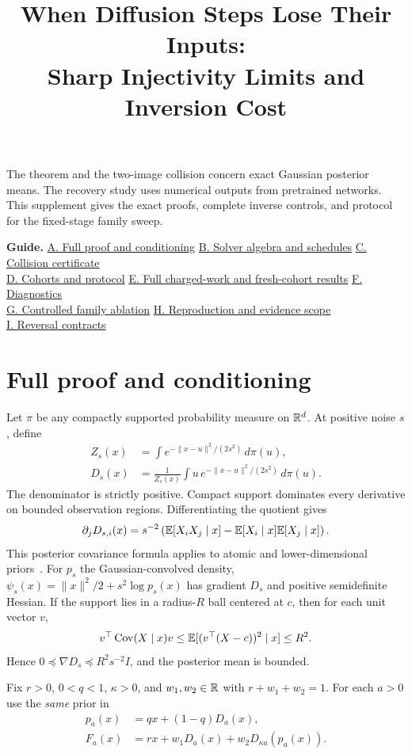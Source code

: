 \documentclass[10pt,twocolumn,letterpaper]{article}
\title{When Diffusion Steps Lose Their Inputs:\\Sharp Injectivity Limits and Inversion Cost}
\begin{document}
\maketitlesupplementary

\noindent The theorem and the two-image collision concern exact Gaussian posterior means. The recovery study uses numerical outputs from pretrained networks. This supplement gives the exact proofs, complete inverse controls, and protocol for the fixed-stage family sweep.

\medskip
\noindent\textbf{Guide.}
\hyperref[sec:proof]{A. Full proof and conditioning}
\enspace\textperiodcentered\enspace
\hyperref[sec:algebra]{B. Solver algebra and schedules}
\enspace\textperiodcentered\enspace
\hyperref[sec:exact]{C. Collision certificate}\\
\hyperref[sec:protocol]{D. Cohorts and protocol}
\enspace\textperiodcentered\enspace
\hyperref[sec:observations]{E. Full charged-work and fresh-cohort results}
\enspace\textperiodcentered\enspace
\hyperref[sec:diagnostics]{F. Diagnostics}\\
\hyperref[sec:controlled]{G. Controlled family ablation}
\enspace\textperiodcentered\enspace
\hyperref[sec:replay]{H. Reproduction and evidence scope}\\
\hyperref[sec:contracts]{I. Reversal contracts}

\section{Full proof and conditioning}
\label{sec:proof}
Let $\pi$ be any compactly supported probability measure on $\mathbb R^d$. At positive noise $s$, define
\[
 \begin{aligned}
 Z_s(x)&=\int e^{-\|x-u\|^2/(2s^2)}\,d\pi(u),\\
 D_s(x)&=\frac{1}{Z_s(x)}\int u\, e^{-\|x-u\|^2/(2s^2)}\,d\pi(u).
 \end{aligned}
\]
The denominator is strictly positive. Compact support dominates every derivative on bounded observation regions. Differentiating the quotient gives
\[
 \partial_jD_{s,i}(x)=s^{-2}\left(\mathbb E[X_iX_j\mid x]-\mathbb E[X_i\mid x]\mathbb E[X_j\mid x]\right).
\]
This posterior covariance formula applies to atomic and lower-dimensional priors~\cite{gribonval2021}. For $p_s$ the Gaussian-convolved density, $\psi_s(x)=\|x\|^2/2+s^2\log p_s(x)$ has gradient $D_s$ and positive semidefinite Hessian. If the support lies in a radius-$R$ ball centered at $c$, then for each unit vector $v$,
\[
 v^\top\operatorname{Cov}(X\mid x)v\le \mathbb E[(v^\top(X-c))^2\mid x]\le R^2.
\]
Hence $0\preceq\nabla D_s\preceq R^2s^{-2}I$, and the posterior mean is bounded.

Fix $r>0$, $0<q<1$, $\kappa>0$, and $w_1,w_2\in\mathbb R$ with $r+w_1+w_2=1$. For each $a>0$ use the \emph{same} prior in
\[
 \begin{aligned}
 p_a(x)&=qx+(1-q)D_a(x),\\
 F_a(x)&=rx+w_1D_a(x)+w_2D_{\kappa a}(p_a(x)).
 \end{aligned}
\]
\end{document}

